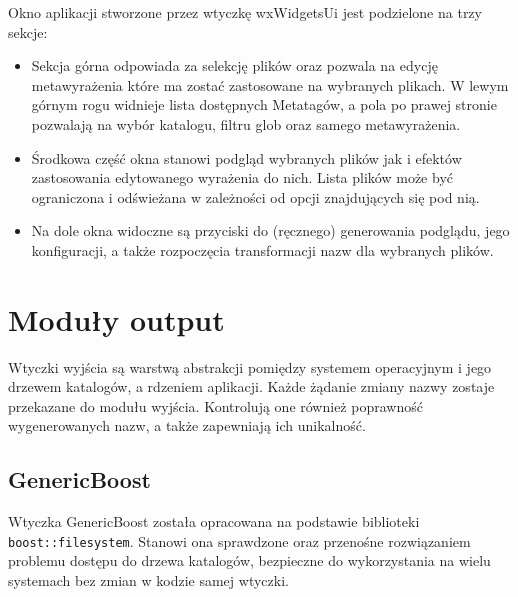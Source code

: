 Okno aplikacji stworzone przez wtyczkę wxWidgetsUi jest podzielone na trzy sekcje:
\begin{itemize}
\item Sekcja górna odpowiada za selekcję plików oraz pozwala na edycję metawyrażenia które ma zostać zastosowane na wybranych plikach.
W lewym górnym rogu widnieje lista dostępnych Metatagów, a pola po prawej stronie pozwalają na wybór katalogu, filtru glob oraz samego metawyrażenia.

\item Środkowa część okna stanowi podgląd wybranych plików jak i efektów zastosowania edytowanego wyrażenia do nich. Lista plików może być ograniczona i odświeżana w zależności od opcji znajdujących się pod nią.

\item Na dole okna widoczne są przyciski do (ręcznego) generowania podglądu, jego konfiguracji, a także rozpoczęcia transformacji nazw dla wybranych plików.
\end{itemize}


\section{Moduły output}
\par
Wtyczki wyjścia są warstwą abstrakcji pomiędzy systemem operacyjnym i jego drzewem katalogów, a rdzeniem aplikacji.
Każde żądanie zmiany nazwy zostaje przekazane do modułu wyjścia.
Kontrolują one również poprawność wygenerowanych nazw, a także zapewniają ich unikalność.

\subsection{GenericBoost}
Wtyczka GenericBoost została opracowana na podstawie biblioteki \texttt{boost::filesystem}. Stanowi ona sprawdzone oraz przenośne rozwiązaniem problemu dostępu do drzewa katalogów, bezpieczne do wykorzystania na wielu systemach bez zmian w kodzie samej wtyczki.


